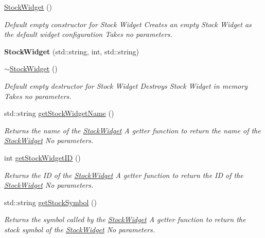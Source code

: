 \begin{DoxyCompactItemize}
\item 
\mbox{\hyperlink{class_stock_widget_aa2748d2e00f0e4b91e1aea0faccba2f1}{Stock\+Widget}} ()
\begin{DoxyCompactList}\small\item\em Default empty constructor for Stock Widget  Creates an empty Stock Widget as the default widget configuration  Takes no parameters. \end{DoxyCompactList}\item 
\mbox{\label{class_stock_widget_a71739ffb4f0a718ff12203c2d30421ce}} 
{\bfseries Stock\+Widget} (std\+::string, int, std\+::string)
\item 
\mbox{\hyperlink{class_stock_widget_a439ffbe3e2ebbd7e0760ee10156448b5}{$\sim$\+Stock\+Widget}} ()
\begin{DoxyCompactList}\small\item\em Default empty destructor for Stock Widget  Destroys Stock Widget in memory  Takes no parameters. \end{DoxyCompactList}\item 
std\+::string \mbox{\hyperlink{class_stock_widget_ad2db18f7104a367ddc9fe56d019249cb}{get\+Stock\+Widget\+Name}} ()
\begin{DoxyCompactList}\small\item\em Returns the name of the \mbox{\hyperlink{class_stock_widget}{Stock\+Widget}}  A getter function to return the name of the \mbox{\hyperlink{class_stock_widget}{Stock\+Widget}}  No parameters. \end{DoxyCompactList}\item 
int \mbox{\hyperlink{class_stock_widget_ab29e0ec75f29ecc1b1a16423de40ac46}{get\+Stock\+Widget\+ID}} ()
\begin{DoxyCompactList}\small\item\em Returns the ID of the \mbox{\hyperlink{class_stock_widget}{Stock\+Widget}}  A getter function to return the ID of the \mbox{\hyperlink{class_stock_widget}{Stock\+Widget}}  No parameters. \end{DoxyCompactList}\item 
std\+::string \mbox{\hyperlink{class_stock_widget_a69debafcc6d655a83e4e3af67a78e8c3}{get\+Stock\+Symbol}} ()
\begin{DoxyCompactList}\small\item\em Returns the symbol called by the \mbox{\hyperlink{class_stock_widget}{Stock\+Widget}}  A getter function to return the stock symbol of the \mbox{\hyperlink{class_stock_widget}{Stock\+Widget}}  No parameters. \end{DoxyCompactList}\item 

\end{DoxyCompactItemize}
